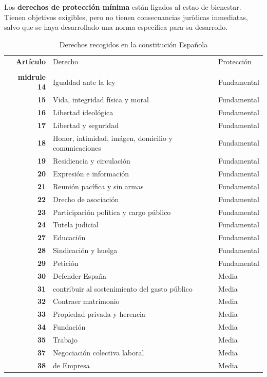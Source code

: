         Los \textbf{derechos de protección mínima} están ligados al estao de bienestar. Tienen objetivos exigibles, pero no tienen consecuancias jurídicas inmediatas, salvo que se haya desarrollado una norma específica para su desarrollo.

        \begin{table}[H]
        \caption{Derechos recogidos en la constitución Española}
        \begin{tabular}{>{\bfseries}rll}
        Artículo & Derecho & Protección \\
        \\midrule
        14 & Igualdad ante la ley & Fundamental \\
        15 & Vida, integridad física y moral & Fundamental \\
        16 & Libertad ideológica & Fundamental \\
        17 & Libertad y seguridad & Fundamental \\
        18 & Honor, intimidad, imágen, domicilio y comunicaciones  & Fundamental \\
        19 & Residiencia y circulación & Fundamental \\
        20 & Expresión e información & Fundamental \\ 
        21 & Reunión pacífica y sin armas & Fundamental \\
        22 & Drecho de asociación & Fundamental \\
        23 & Participación política y cargo público & Fundamental \\
        24 & Tutela judicial & Fundamental \\
        27 & Educación & Fundamental \\
        28 & Sindicación y huelga & Fundamental \\
        29 & Petición & Fundamental \\
        30 & Defender España & Media \\
        31 & contribuir al sostenimiento del gasto público & Media \\
        32 & Contraer matrimonio & Media \\
        33 & Propiedad privada y herencia & Media \\
        34 & Fundación & Media \\
        35 & Trabajo & Media \\
        37 & Negociación colectiva laboral & Media \\
        38 & de Empresa & Media \\

\end{tabular}
\end{table}
